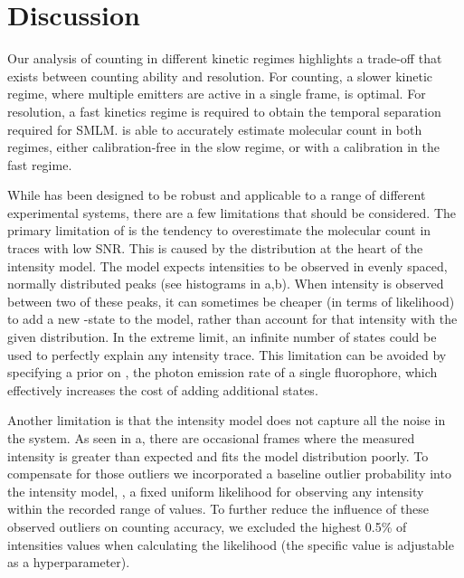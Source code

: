 \section{Discussion} \label{discussion}

Our analysis of counting in different kinetic regimes highlights a trade-off 
that exists between counting ability and resolution.
  For counting, a slower kinetic regime, where multiple emitters are active in a single frame, is optimal. 
  For resolution, a fast kinetics regime is required to obtain the temporal separation required for SMLM.
  \ours is able to accurately estimate molecular count in both regimes, either calibration-free in the slow regime, 
  or with a calibration in the fast regime.

While \ours has been designed to be robust and applicable to a range of 
different experimental systems, there are a few limitations that should be considered.
  The primary limitation of \ours is the tendency to overestimate the molecular
  count in traces with low SNR.
  This is caused by the distribution at the heart of the intensity model. 
  The model expects intensities to be observed in evenly spaced, normally
  distributed peaks (see histograms in a,b).
  When intensity is observed between two of these peaks, it can sometimes be
  cheaper (in terms of likelihood) to add a new \z{}-state to the model, rather
  than account for that intensity with the given distribution.
  In the extreme limit, an infinite number of states could be used to perfectly
  explain any intensity trace.
  This limitation can be avoided by specifying a prior on \re, the photon
  emission rate of a single fluorophore, which effectively increases the cost
  of adding additional states.

Another limitation is that the intensity model does not capture all the noise
in the system.
    As seen in a, there are occasional
    frames where the measured intensity is greater than expected and 
    fits the model distribution poorly.
    To compensate for those outliers we incorporated a baseline outlier
    probability into the intensity model, \ie, a fixed uniform likelihood for
    observing any intensity within the recorded range of values.
    To further reduce the influence of these observed outliers on counting accuracy, we
    excluded the highest 0.5\% of intensities values when calculating the
    likelihood (the specific value is adjustable as a hyperparameter).

